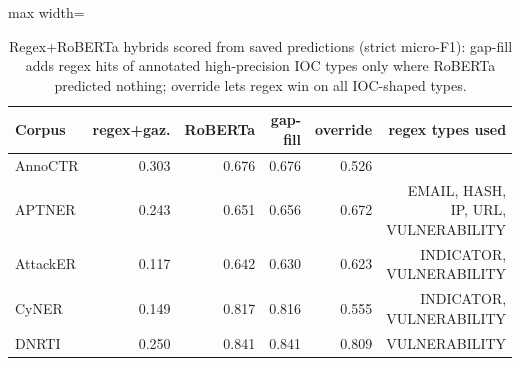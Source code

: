\begin{table}[t]
\centering
\caption{Regex+RoBERTa hybrids scored from saved predictions (strict micro-F1): gap-fill adds regex hits of annotated high-precision IOC types only where RoBERTa predicted nothing; override lets regex win on all IOC-shaped types.}
\label{tab:hybrid}
\small
\begin{adjustbox}{max width=\textwidth}
\begin{tabular}{lrrrrr}
\toprule
Corpus & regex+gaz. & RoBERTa & gap-fill & override & regex types used \\
\midrule
AnnoCTR & 0.303 & 0.676 & 0.676 & 0.526 &  \\
APTNER & 0.243 & 0.651 & 0.656 & 0.672 & EMAIL, HASH, IP, URL, VULNERABILITY \\
AttackER & 0.117 & 0.642 & 0.630 & 0.623 & INDICATOR, VULNERABILITY \\
CyNER & 0.149 & 0.817 & 0.816 & 0.555 & INDICATOR, VULNERABILITY \\
DNRTI & 0.250 & 0.841 & 0.841 & 0.809 & VULNERABILITY \\
\bottomrule
\end{tabular}
\end{adjustbox}
\end{table}